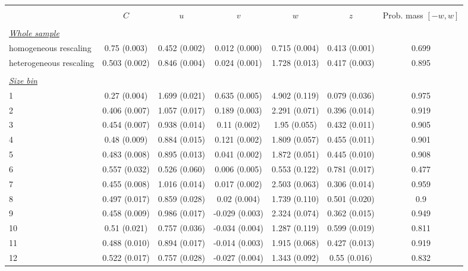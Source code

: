 
\begin{tabular}{@{\extracolsep{5pt}} l cccccc} 
\\[-1.8ex]\hline 
\hline \\[-1.8ex] 
 & $C$ & $u$ & $v$ & $w$ & $z$ & Prob. mass $[-w,w]$ \\ 
\hline \\[-1.8ex] 
\underline{{\it Whole sample}} &   &   &   &   &   &  \\ 
homogeneous rescaling & 0.75 (0.003) & 0.452 (0.002) & 0.012 (0.000) & 0.715 (0.004) & 0.413 (0.001) & 0.699 \\ 
heterogeneous rescaling & 0.503 (0.002) & 0.846 (0.004) & 0.024 (0.001) & 1.728 (0.013) & 0.417 (0.003) & 0.895 \\ 
 &   &   &   &   &   &  \\ 
\underline{{\it Size bin}} &   &   &   &   &   &  \\ 
1 & 0.27 (0.004) & 1.699 (0.021) & 0.635 (0.005) & 4.902 (0.119) & 0.079 (0.036) & 0.975 \\ 
2 & 0.406 (0.007) & 1.057 (0.017) & 0.189 (0.003) & 2.291 (0.071) & 0.396 (0.014) & 0.919 \\ 
3 & 0.454 (0.007) & 0.938 (0.014) & 0.11 (0.002) & 1.95 (0.055) & 0.432 (0.011) & 0.905 \\ 
4 & 0.48 (0.009) & 0.884 (0.015) & 0.121 (0.002) & 1.809 (0.057) & 0.455 (0.011) & 0.901 \\ 
5 & 0.483 (0.008) & 0.895 (0.013) & 0.041 (0.002) & 1.872 (0.051) & 0.445 (0.010) & 0.908 \\ 
6 & 0.557 (0.032) & 0.526 (0.060) & 0.006 (0.005) & 0.553 (0.122) & 0.781 (0.017) & 0.477 \\ 
7 & 0.455 (0.008) & 1.016 (0.014) & 0.017 (0.002) & 2.503 (0.063) & 0.306 (0.014) & 0.959 \\ 
8 & 0.497 (0.017) & 0.859 (0.028) & 0.02 (0.004) & 1.739 (0.110) & 0.501 (0.020) & 0.9 \\ 
9 & 0.458 (0.009) & 0.986 (0.017) & -0.029 (0.003) & 2.324 (0.074) & 0.362 (0.015) & 0.949 \\ 
10 & 0.51 (0.021) & 0.757 (0.036) & -0.034 (0.004) & 1.287 (0.119) & 0.599 (0.019) & 0.811 \\ 
11 & 0.488 (0.010) & 0.894 (0.017) & -0.014 (0.003) & 1.915 (0.068) & 0.427 (0.013) & 0.919 \\ 
12 & 0.522 (0.017) & 0.757 (0.028) & -0.027 (0.004) & 1.343 (0.092) & 0.55 (0.016) & 0.832 \\ 

\end{tabular}
